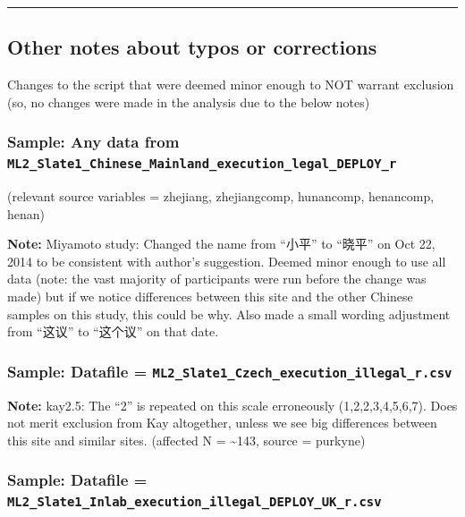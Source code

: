 \documentclass[]{article}
\begin{document}
\begin{center}\rule{0.5\linewidth}{\linethickness}\end{center}

\subsection{Other notes about typos or
corrections}\label{other-notes-about-typos-or-corrections}

Changes to the script that were deemed minor enough to NOT warrant
exclusion (so, no changes were made in the analysis due to the below
notes)

\subsubsection{\textbf{Sample:} Any data from
\texttt{ML2\_Slate1\_Chinese\_Mainland\_execution\_legal\_DEPLOY\_r}}\label{sample-any-data-from-ml2ux5fslate1ux5fchineseux5fmainlandux5fexecutionux5flegalux5fdeployux5fr}

(relevant source variables = zhejiang, zhejiangcomp, hunancomp,
henancomp, henan)

\textbf{Note:} Miyamoto study: Changed the name from ``小平'' to
``晓平'' on Oct 22, 2014 to be consistent with author's suggestion.
Deemed minor enough to use all data (note: the vast majority of
participants were run before the change was made) but if we notice
differences between this site and the other Chinese samples on this
study, this could be why. Also made a small wording adjustment from
``这议'' to ``这个议'' on that date.

\subsubsection{\textbf{Sample:} Datafile =
\texttt{ML2\_Slate1\_Czech\_execution\_illegal\_r.csv}}\label{sample-datafile-ml2ux5fslate1ux5fczechux5fexecutionux5fillegalux5fr.csv}

\textbf{Note:} kay2.5: The ``2'' is repeated on this scale erroneously
(1,2,2,3,4,5,6,7). Does not merit exclusion from Kay altogether, unless
we see big differences between this site and similar sites. (affected N
= \textasciitilde{}143, source = purkyne)

\subsubsection{\textbf{Sample:} Datafile =
\texttt{ML2\_Slate1\_Inlab\_execution\_illegal\_DEPLOY\_UK\_r.csv}}\label{sample-datafile-ml2ux5fslate1ux5finlabux5fexecutionux5fillegalux5fdeployux5fukux5fr.csv}
\end{document}
